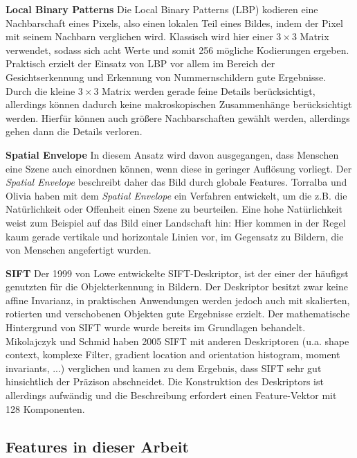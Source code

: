 \textbf{Local Binary Patterns} Die Local Binary Patterns (LBP) kodieren eine Nachbarschaft eines Pixels, also einen lokalen Teil eines Bildes, indem der Pixel mit seinem Nachbarn verglichen wird. Klassisch wird hier einer $3 \times 3$ Matrix verwendet, sodass sich acht Werte und somit 256 mögliche Kodierungen ergeben.
Praktisch erzielt der Einsatz von LBP vor allem im Bereich der Gesichtserkennung und Erkennung von Nummernschildern gute Ergebnisse. Durch die kleine $3 \times 3$ Matrix werden gerade feine Details berücksichtigt, allerdings können dadurch keine makroskopischen Zusammenhänge berücksichtigt werden. Hierfür können auch größere Nachbarschaften gewählt werden, allerdings gehen dann die Details verloren.\newline 

\textbf{Spatial Envelope} In diesem Ansatz wird davon ausgegangen, dass Menschen eine Szene auch einordnen können, wenn diese in geringer Auflösung vorliegt. Der \textit{Spatial Envelope} beschreibt daher das Bild durch globale Features. Torralba und Olivia \cite{mts2001} haben mit dem  \textit{Spatial Envelope} ein Verfahren entwickelt, um die z.B. die Natürlichkeit oder Offenheit einen Szene zu beurteilen. Eine hohe Natürlichkeit weist zum Beispiel auf das Bild einer Landschaft hin: Hier kommen in der Regel kaum gerade vertikale und horizontale Linien vor, im Gegensatz zu Bildern, die von Menschen angefertigt wurden.\newline

\textbf{SIFT} Der 1999 von Lowe entwickelte SIFT-Deskriptor, ist der einer der häufigst genutzten für die Objekterkennung in Bildern. Der Deskriptor besitzt zwar keine affine Invarianz, in praktischen Anwendungen werden jedoch auch mit skalierten, rotierten und verschobenen Objekten gute Ergebnisse erzielt.
Der mathematische Hintergrund von SIFT wurde wurde bereits im Grundlagen behandelt. Mikolajczyk und Schmid \cite{idp2005} haben 2005 SIFT mit anderen Deskriptoren (u.a. shape context, komplexe Filter, gradient location and orientation histogram, moment invariants, ...) verglichen und kamen zu dem Ergebnis, dass SIFT sehr gut hinsichtlich der Präzison abschneidet. Die Konstruktion des Deskriptors ist allerdings aufwändig und die Beschreibung erfordert einen Feature-Vektor mit 128 Komponenten.\newline

\subsection{Features in dieser Arbeit}

